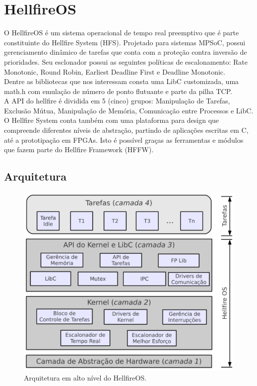 \section{HellfireOS}
\label{sec:HellfireOS}
O HellfireOS \cite{hellfireos} é um sistema operacional de tempo real preemptivo que é parte constituinte
do Hellfire System (HFS). Projetado para sistemas MPSoC, possui gerenciamento
dinâmico de tarefas que conta com a proteção contra inversão de prioridades. Seu esclonador
possui as seguintes políticas de escalonamento:
Rate Monotonic, Round Robin, Earliest Deadline First e Deadline Monotonic.\\

Dentre as bibliotecas que nos interessam consta uma LibC customizada, uma math.h com emulação
de número de ponto flutuante e parte da pilha TCP.\\
A API do hellfire é dividida em 5 (cinco) grupos: Manipulação de Tarefas, Exclusão Mútua,
Manipulação de Memória, Comunicação entre Processos e LibC.\\
O Hellfire System conta também com uma plataforma para design que compreende diferentes
níveis de abstração, partindo de aplicações escritas em C, até a prototipação em FPGAs.
Isto é possível graças as ferramentas e módulos que fazem parte do Hellfire Framework (HFFW).
\subsection{Arquitetura}
\begin{figure}[H]
	\centering
		\includegraphics[width=\textwidth,height=\textheight,keepaspectratio]{fig/HellfireArch.png}
	\caption{Arquitetura em alto nível do HellfireOS.}
\end{figure}
